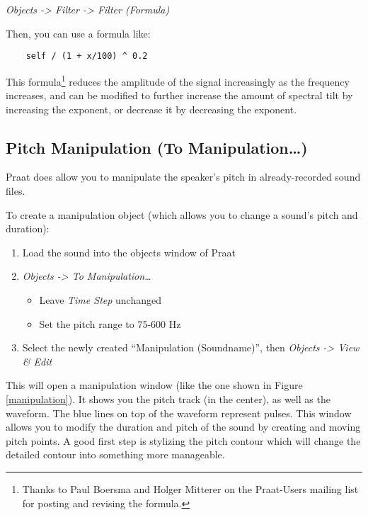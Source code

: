 \documentclass[11pt]{article}
\def\tightlist{}
\begin{document}
\emph{Objects -\textgreater{} Filter -\textgreater{} Filter (Formula)}

Then, you can use a formula like:

\begin{verbatim}
    self / (1 + x/100) ^ 0.2
\end{verbatim}

This
formula\footnote{Thanks to Paul Boersma and Holger Mitterer on the Praat-Users mailing list for posting and revising the formula.}
reduces the amplitude of the signal increasingly as the frequency
increases, and can be modified to further increase the amount of
spectral tilt by increasing the exponent, or decrease it by decreasing
the exponent.

\hypertarget{pitch-manipulation-to-manipulation}{%
\subsection{Pitch Manipulation (To
Manipulation\ldots)}\label{pitch-manipulation-to-manipulation}}

Praat does allow you to manipulate the speaker's pitch in
already-recorded sound files.

To create a manipulation object (which allows you to change a sound's
pitch and duration):

\begin{enumerate}
\def\labelenumi{\arabic{enumi}.}
\tightlist
\item
  Load the sound into the objects window of Praat
\item
  \emph{Objects -\textgreater{} To Manipulation\ldots{}}

  \begin{itemize}
  \tightlist
  \item
    Leave \emph{Time Step} unchanged
  \item
    Set the pitch range to 75-600 Hz
  \end{itemize}
\item
  Select the newly created ``Manipulation (Soundname)'', then
  \emph{Objects -\textgreater{} View \& Edit}
\end{enumerate}

This will open a manipulation window (like the one shown in Figure
\ref{manipulation}). It shows you the pitch track (in the center), as
well as the waveform. The blue lines on top of the waveform represent
pulses. This window allows you to modify the duration and pitch of the
sound by creating and moving pitch points. A good first step is
stylizing the pitch contour which will change the detailed contour into
something more manageable.
\end{document}
